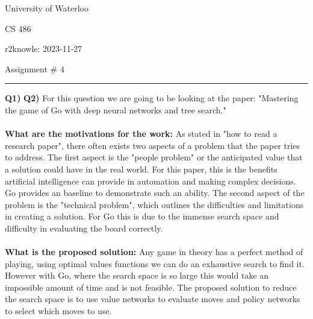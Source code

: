 \documentclass{article}
\begin{document}
\begin{titlepage}
	\setlength{\parindent}{0pt}
	\large

\vspace*{-2cm}



University of Waterloo \par
CS 486 \par
\vspace{0.05cm}
r2knowle: 2023-11-27
\vspace{0.2cm}

{\huge Assignment \# 4 \par}
\hrule

\vspace{0.5cm}
\textbf{Q1)}
\newpage
\textbf{Q2)} For this question we are going to be looking at the paper: "Mastering the game of Go with deep neural networks and tree search." \\\\

\textbf{What are the motivations for the work:} As stated in "how to read a research paper", there often exists two aspects of a problem that the paper tries to address. The first aspect is the "people problem" or the anticipated value that a solution could have in the real world. For this paper, this is the benefits artificial intelligence can provide in automation and making complex decisions. Go provides an baseline to demonstrate such an ability. The second aspect of the problem is the "technical problem", which outlines the difficulties and limitations in creating a solution. For Go this is due to the immense search space and difficulty in evaluating the board correctly.\\\\

\textbf{What is the proposed solution:} Any game in theory has a perfect method of playing, using optimal values functions we can do an exhaustive search to find it. However with Go, where the search space is so large this would take an impossible amount of time and is not feasible. The proposed solution to reduce the search space is to use value networks to evaluate moves and policy networks to select which moves to use.  \\\\


\end{titlepage}
\end{document}

